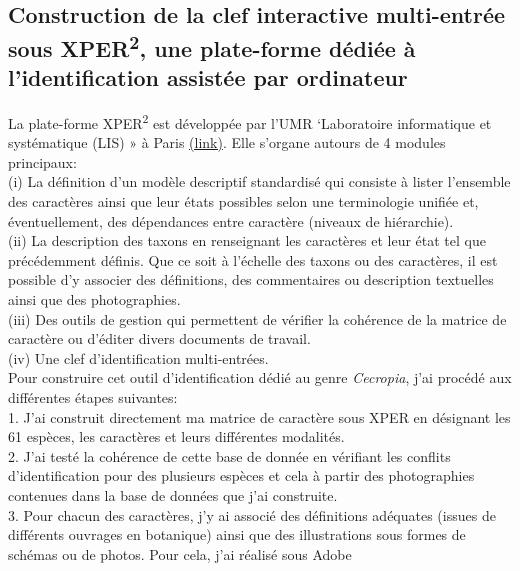 \documentclass[a4paper]{article}
\theoremstyle{definition}
\theoremstyle{definition}
\theoremstyle{definition}
\theoremstyle{remark}
\begin{document}
\subsection{\texorpdfstring{Construction de la clef interactive
multi-entrée sous XPER\textsuperscript{2}, une plate-forme dédiée à
l'identification assistée par
ordinateur}{Construction de la clef interactive multi-entrée sous XPER2, une plate-forme dédiée à l'identification assistée par ordinateur}}\label{construction-de-la-clef-interactive-multi-entree-sous-xper2-une-plate-forme-dediee-a-lidentification-assistee-par-ordinateur}

La plate-forme XPER\textsuperscript{2} est développée par l'UMR
`Laboratoire informatique et systématique (LIS) » à Paris
\href{http://lis-upmc.snv.jussieu.fr/lis/?q=ressources/logiciels/xper2}{(link)}.
Elle s'organe autours de 4 modules principaux:\\
(i) La définition d'un modèle descriptif standardisé qui consiste à
lister l'ensemble des caractères ainsi que leur états possibles selon
une terminologie unifiée et, éventuellement, des dépendances entre
caractère (niveaux de hiérarchie).\\
(ii) La description des taxons en renseignant les caractères et leur
état tel que précédemment définis. Que ce soit à l'échelle des taxons ou
des caractères, il est possible d'y associer des définitions, des
commentaires ou description textuelles ainsi que des photographies.\\
(iii) Des outils de gestion qui permettent de vérifier la cohérence de
la matrice de caractère ou d'éditer divers documents de travail.\\
(iv) Une clef d'identification multi-entrées.\\
Pour construire cet outil d'identification dédié au genre
\emph{Cecropia}, j'ai procédé aux différentes étapes suivantes:\\
1. J'ai construit directement ma matrice de caractère sous XPER en
désignant les 61 espèces, les caractères et leurs différentes
modalités.\\
2. J'ai testé la cohérence de cette base de donnée en vérifiant les
conflits d'identification pour des plusieurs espèces et cela à partir
des photographies contenues dans la base de données que j'ai
construite.\\
3. Pour chacun des caractères, j'y ai associé des définitions adéquates
(issues de différents ouvrages en botanique) ainsi que des illustrations
sous formes de schémas ou de photos. Pour cela, j'ai réalisé sous Adobe
\end{document}
